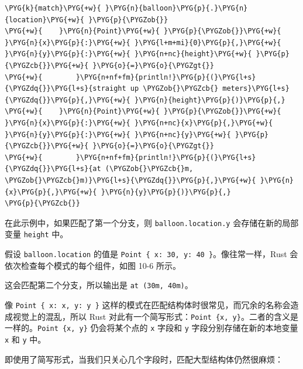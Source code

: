 \begin{Verbatim}[commandchars=\\\{\},breaklines=true,breakanywhere=true,fontsize=\codefont,xleftmargin=17bp]
\PYG{k}{match}\PYG{+w}{ }\PYG{n}{balloon}\PYG{p}{.}\PYG{n}{location}\PYG{+w}{ }\PYG{p}{\PYGZob{}}
\PYG{+w}{    }\PYG{n}{Point}\PYG{+w}{ }\PYG{p}{\PYGZob{}}\PYG{+w}{ }\PYG{n}{x}\PYG{p}{:}\PYG{+w}{ }\PYG{l+m+mi}{0}\PYG{p}{,}\PYG{+w}{ }\PYG{n}{y}\PYG{p}{:}\PYG{+w}{ }\PYG{n+nc}{height}\PYG{+w}{ }\PYG{p}{\PYGZcb{}}\PYG{+w}{ }\PYG{o}{=}\PYG{o}{\PYGZgt{}}
\PYG{+w}{        }\PYG{n+nf+fm}{println!}\PYG{p}{(}\PYG{l+s}{\PYGZdq{}}\PYG{l+s}{straight up \PYGZob{}\PYGZcb{} meters}\PYG{l+s}{\PYGZdq{}}\PYG{p}{,}\PYG{+w}{ }\PYG{n}{height}\PYG{p}{)}\PYG{p}{,}
\PYG{+w}{    }\PYG{n}{Point}\PYG{+w}{ }\PYG{p}{\PYGZob{}}\PYG{+w}{ }\PYG{n}{x}\PYG{p}{:}\PYG{+w}{ }\PYG{n+nc}{x}\PYG{p}{,}\PYG{+w}{ }\PYG{n}{y}\PYG{p}{:}\PYG{+w}{ }\PYG{n+nc}{y}\PYG{+w}{ }\PYG{p}{\PYGZcb{}}\PYG{+w}{ }\PYG{o}{=}\PYG{o}{\PYGZgt{}}
\PYG{+w}{        }\PYG{n+nf+fm}{println!}\PYG{p}{(}\PYG{l+s}{\PYGZdq{}}\PYG{l+s}{at (\PYGZob{}\PYGZcb{}m, \PYGZob{}\PYGZcb{}m)}\PYG{l+s}{\PYGZdq{}}\PYG{p}{,}\PYG{+w}{ }\PYG{n}{x}\PYG{p}{,}\PYG{+w}{ }\PYG{n}{y}\PYG{p}{)}\PYG{p}{,}
\PYG{p}{\PYGZcb{}}
\end{Verbatim}

在此示例中，如果匹配了第一个分支，则 \texttt{balloon.location.y} 会存储在新的局部变量 \texttt{height} 中。

假设 \texttt{balloon.location} 的值是 \texttt{Point \{ x: 30, y: 40 \}}。像往常一样，Rust 会依次检查每个模式的每个组件，如图 10-6 所示。


这会匹配第二个分支，所以输出是 \texttt{at (30m, 40m)}。

像 \texttt{Point \{ x: x, y: y \}} 这样的模式在匹配结构体时很常见，而冗余的名称会造成视觉上的混乱，所以 Rust 对此有一个简写形式：\texttt{Point \{x, y\}}。二者的含义是一样的。\texttt{Point \{x, y\}} 仍会将某个点的 \texttt{x} 字段和 \texttt{y} 字段分别存储在新的本地变量 \texttt{x} 和 \texttt{y} 中。

即使用了简写形式，当我们只关心几个字段时，匹配大型结构体仍然很麻烦：

